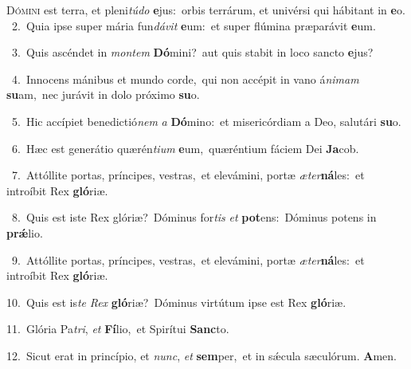 \lettrine{\initial\textcolor{\initialcolor}{D}}{ómini} est terra, et pleni\-\textit{tú}\-\textit{do} \textbf{e}\-jus:~\star orbis terrárum, et univérsi qui hábitant in \textbf{e}\-o.\\
{\numbfont\textcolor{\numbcolor}{~2.}}~Quia ipse super mária fun\-\textit{dá}\-\textit{vit} \textbf{e}\-um:~\star et super flúmina præparávit \textbf{e}\-um.\par
{\numbfont\textcolor{\numbcolor}{~3.}}~Quis ascéndet in \textit{mon}\-\textit{tem} \textbf{Dó}\-mini?~\star aut quis stabit in loco sancto \textbf{e}\-jus?\par
{\numbfont\textcolor{\numbcolor}{~4.}}~Innocens mánibus et mundo corde,~\dagger qui non accépit in vano á\-\textit{ni}\-\textit{mam} \textbf{su}\-am,~\star nec jurávit in dolo próximo \textbf{su}\-o.\par
{\numbfont\textcolor{\numbcolor}{~5.}}~Hic accípiet benedictió\textit{nem} \textit{a} \textbf{Dó}\-mino:~\star et misericórdiam a Deo, salutári \textbf{su}\-o.\par
{\numbfont\textcolor{\numbcolor}{~6.}}~Hæc est generátio quærén\-\textit{ti}\-\textit{um} \textbf{e}\-um,~\star quæréntium fáciem Dei \textbf{Ja}\-cob.\par
{\numbfont\textcolor{\numbcolor}{~7.}}~Attóllite portas, príncipes, vestras,~\dagger et elevámini, portæ \textit{æ}\-\textit{ter}\textbf{ná}les:~\star et introíbit Rex \textbf{gló}\-riæ.\par
{\numbfont\textcolor{\numbcolor}{~8.}}~Quis est iste Rex glóriæ?~\dagger Dóminus for\textit{tis} \textit{et} \textbf{pot}\-ens:~\star Dóminus potens in \textbf{prǽ}\-lio.\par
{\numbfont\textcolor{\numbcolor}{~9.}}~Attóllite portas, príncipes, vestras,~\dagger et elevámini, portæ \textit{æ}\-\textit{ter}\textbf{ná}les:~\star et introíbit Rex \textbf{gló}\-riæ.\par
{\numbfont\textcolor{\numbcolor}{10.}}~Quis est is\textit{te} \textit{Rex} \textbf{gló}\-riæ?~\star Dóminus virtútum ipse est Rex \textbf{gló}\-riæ.\par
{\numbfont\textcolor{\numbcolor}{11.}}~Glória Pa\-\textit{tri}\-, \textit{et} \textbf{Fí}\-lio,~\star et Spirítui \textbf{Sanc}\-to.\par
{\numbfont\textcolor{\numbcolor}{12.}}~Sicut erat in princípio, et \textit{nunc}\-, \textit{et} \textbf{sem}\-per,~\star et in sǽcula sæculórum. \textbf{A}\-men.\par
